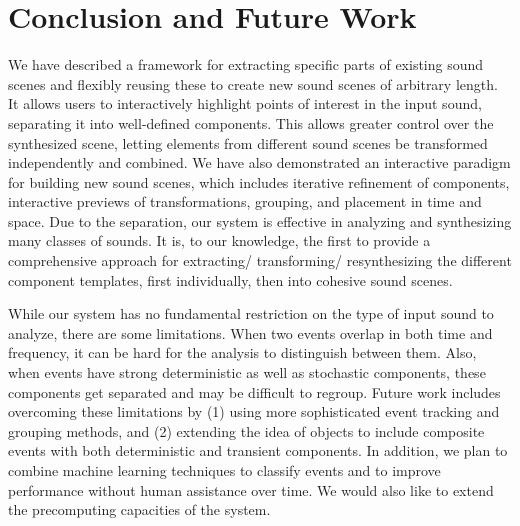 \documentclass[a4paper]{article}
\begin{document}
\section{Conclusion and Future Work}

We have described a framework for extracting specific parts of existing sound scenes and 
flexibly reusing these to create new sound scenes of arbitrary length. 
It allows users to interactively highlight points of interest in the input 
sound, separating it into well-defined components. This allows greater control 
over the synthesized scene, letting elements from different 
sound scenes be transformed independently and combined.
We have also demonstrated an interactive paradigm for building new sound scenes, which 
includes iterative refinement of components, interactive previews of transformations, 
grouping, and placement 
in time and space.  Due to the separation, our system is effective in analyzing and 
synthesizing many classes of sounds. It is, to our knowledge, the first to 
provide a comprehensive approach 
for extracting/ transforming/ resynthesizing the different component templates, first
individually, then into cohesive sound scenes.

While our system has no fundamental restriction on the type of input sound to analyze,
there are some limitations. 
When two events overlap in both time and frequency, it can be hard for the
analysis to distinguish between them. Also, when events have strong deterministic as well as 
stochastic components, these components get separated and may be difficult to regroup. 
Future work includes overcoming these limitations by (1) using more sophisticated event tracking 
and grouping methods, and (2) extending the idea of objects to include composite events with both 
deterministic and transient components. In addition, we plan to combine machine learning techniques 
to classify events and to improve performance without human assistance over time. We would also like to 
extend the precomputing capacities of the system. 
\end{document}
